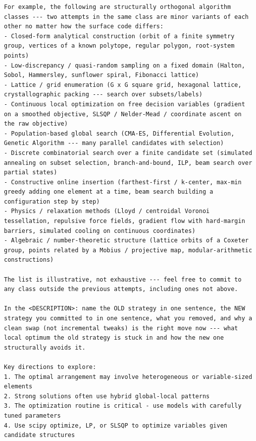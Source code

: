 \documentclass{llmxive}
\begin{document}
\begin{ttcolorbox}
\begin{lstlisting}[style=prompt]
For example, the following are structurally orthogonal algorithm classes --- two attempts in the same class are minor variants of each other no matter how the surface code differs:
- Closed-form analytical construction (orbit of a finite symmetry group, vertices of a known polytope, regular polygon, root-system points)
- Low-discrepancy / quasi-random sampling on a fixed domain (Halton, Sobol, Hammersley, sunflower spiral, Fibonacci lattice)
- Lattice / grid enumeration (G x G square grid, hexagonal lattice, crystallographic packing --- search over subsets/labels)
- Continuous local optimization on free decision variables (gradient on a smoothed objective, SLSQP / Nelder-Mead / coordinate ascent on the raw objective)
- Population-based global search (CMA-ES, Differential Evolution, Genetic Algorithm --- many parallel candidates with selection)
- Discrete combinatorial search over a finite candidate set (simulated annealing on subset selection, branch-and-bound, ILP, beam search over partial states)
- Constructive online insertion (farthest-first / k-center, max-min greedy adding one element at a time, beam search building a configuration step by step)
- Physics / relaxation methods (Lloyd / centroidal Voronoi tessellation, repulsive force fields, gradient flow with hard-margin barriers, simulated cooling on continuous coordinates)
- Algebraic / number-theoretic structure (lattice orbits of a Coxeter group, points related by a Mobius / projective map, modular-arithmetic constructions)

The list is illustrative, not exhaustive --- feel free to commit to any class outside the previous attempts, including ones not above.

In the <DESCRIPTION>: name the OLD strategy in one sentence, the NEW strategy you committed to in one sentence, what you removed, and why a clean swap (not incremental tweaks) is the right move now --- what local optimum the old strategy is stuck in and how the new one structurally avoids it.

Key directions to explore:
1. The optimal arrangement may involve heterogeneous or variable-sized elements
2. Strong solutions often use hybrid global-local patterns
3. The optimization routine is critical - use models with carefully tuned parameters
4. Use scipy optimize, LP, or SLSQP to optimize variables given candidate structures
\end{lstlisting}
\end{ttcolorbox}

\end{document}
